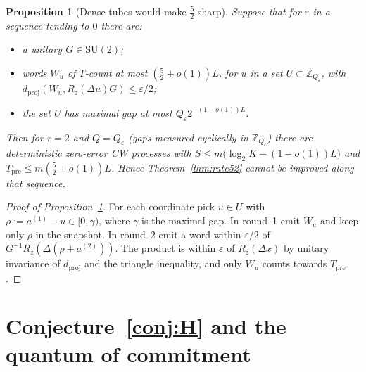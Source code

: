 \documentclass[aps,prx,twocolumn,superscriptaddress,nofootinbib,longbibliography]{revtex4-2}
\theoremstyle{plain}
\newtheorem{proposition}{Proposition}
\theoremstyle{definition}
\theoremstyle{remark}
\newcommand{\dproj}{d_{\mathrm{proj}}}
\newcommand{\Tpre}{T_{\mathrm{pre}}}
\newcommand{\Z}{\mathbb{Z}}
\newcommand{\SU}{\mathrm{SU}(2)}
\begin{document}
\begin{proposition}[Dense tubes would make $\tfrac52$ sharp]\label{prop:dense}
Suppose that for $\varepsilon$ in a sequence tending to $0$ there are:
\begin{itemize}\setlength\itemsep{0pt}
\item a unitary $G\in\SU$;
\item words $W_u$ of $T$-count at most $(\tfrac52+o(1))L$, for $u$ in a set $U\subset\Z_{Q_\varepsilon}$, with $\dproj(W_u,R_z(\Delta u)G)\le\varepsilon/2$;
\item the set $U$ has maximal gap at most $Q_\varepsilon2^{-(1-o(1))L}$.
\end{itemize}
Then for $r=2$ and $Q=Q_\varepsilon$ (gaps measured cyclically in $\Z_{Q_\varepsilon}$) there are deterministic zero-error CW processes with $S\le m\big(\log_2K-(1-o(1))L\big)$ and $\Tpre\le m(\tfrac52+o(1))L$. Hence Theorem~\ref{thm:rate52} cannot be improved along that sequence.
\end{proposition}
\begin{proof}[Proof of Proposition~\ref{prop:dense}]
For each coordinate pick $u\in U$ with $\rho:=a^{(1)}-u\in[0,\gamma)$, where $\gamma$ is the maximal gap. In round~1 emit $W_u$ and keep only $\rho$ in the snapshot. In round~2 emit a word within $\varepsilon/2$ of $G^{-1}R_z(\Delta(\rho+a^{(2)}))$. The product is within $\varepsilon$ of $R_z(\Delta x)$ by unitary invariance of $\dproj$ and the triangle inequality, and only $W_u$ counts towards $\Tpre$.
\end{proof}

\section{Conjecture~\ref{conj:H} and the quantum of commitment}\label{app:conj}
\end{document}
